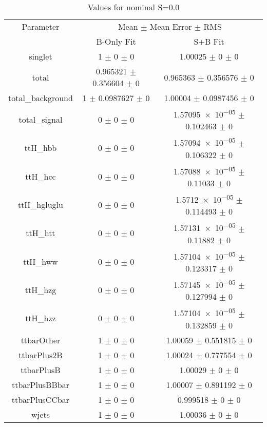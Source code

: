 \begin{table}
\centering
\caption{Values for nominal S=0.0}
\begin{tabular}{ccc}
\toprule
Parameter & \multicolumn{2}{c}{Mean $\pm$ Mean Error $\pm$ RMS}\\
 & B-Only Fit & S+B Fit\\
\midrule
singlet & \num{1} $\pm$ \num{0} $\pm$ \num{0} & \num{1.00025} $\pm$ \num{0} $\pm$ \num{0}\\
total & \num{0.965321} $\pm$ \num{0.356604} $\pm$ \num{0} & \num{0.965363} $\pm$ \num{0.356576} $\pm$ \num{0}\\
total\_background & \num{1} $\pm$ \num{0.0987627} $\pm$ \num{0} & \num{1.00004} $\pm$ \num{0.0987456} $\pm$ \num{0}\\
total\_signal & \num{0} $\pm$ \num{0} $\pm$ \num{0} & \num{1.57095e-05} $\pm$ \num{0.102463} $\pm$ \num{0}\\
ttH\_hbb & \num{0} $\pm$ \num{0} $\pm$ \num{0} & \num{1.57094e-05} $\pm$ \num{0.106322} $\pm$ \num{0}\\
ttH\_hcc & \num{0} $\pm$ \num{0} $\pm$ \num{0} & \num{1.57088e-05} $\pm$ \num{0.11033} $\pm$ \num{0}\\
ttH\_hgluglu & \num{0} $\pm$ \num{0} $\pm$ \num{0} & \num{1.5712e-05} $\pm$ \num{0.114493} $\pm$ \num{0}\\
ttH\_htt & \num{0} $\pm$ \num{0} $\pm$ \num{0} & \num{1.57131e-05} $\pm$ \num{0.11882} $\pm$ \num{0}\\
ttH\_hww & \num{0} $\pm$ \num{0} $\pm$ \num{0} & \num{1.57104e-05} $\pm$ \num{0.123317} $\pm$ \num{0}\\
ttH\_hzg & \num{0} $\pm$ \num{0} $\pm$ \num{0} & \num{1.57145e-05} $\pm$ \num{0.127994} $\pm$ \num{0}\\
ttH\_hzz & \num{0} $\pm$ \num{0} $\pm$ \num{0} & \num{1.57104e-05} $\pm$ \num{0.132859} $\pm$ \num{0}\\
ttbarOther & \num{1} $\pm$ \num{0} $\pm$ \num{0} & \num{1.00059} $\pm$ \num{0.551815} $\pm$ \num{0}\\
ttbarPlus2B & \num{1} $\pm$ \num{0} $\pm$ \num{0} & \num{1.00024} $\pm$ \num{0.777554} $\pm$ \num{0}\\
ttbarPlusB & \num{1} $\pm$ \num{0} $\pm$ \num{0} & \num{1.00029} $\pm$ \num{0} $\pm$ \num{0}\\
ttbarPlusBBbar & \num{1} $\pm$ \num{0} $\pm$ \num{0} & \num{1.00007} $\pm$ \num{0.891192} $\pm$ \num{0}\\
ttbarPlusCCbar & \num{1} $\pm$ \num{0} $\pm$ \num{0} & \num{0.999518} $\pm$ \num{0} $\pm$ \num{0}\\
wjets & \num{1} $\pm$ \num{0} $\pm$ \num{0} & \num{1.00036} $\pm$ \num{0} $\pm$ \num{0}\\
\bottomrule
\end{tabular}
\end{table}